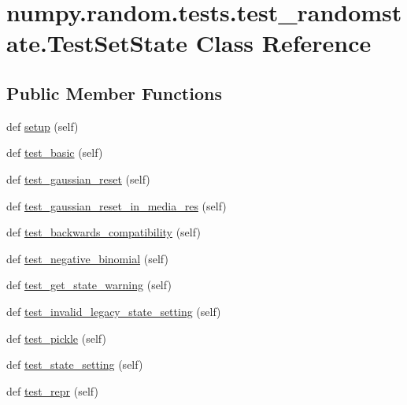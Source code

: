 \hypertarget{classnumpy_1_1random_1_1tests_1_1test__randomstate_1_1TestSetState}{}\section{numpy.\+random.\+tests.\+test\+\_\+randomstate.\+Test\+Set\+State Class Reference}
\label{classnumpy_1_1random_1_1tests_1_1test__randomstate_1_1TestSetState}
\subsection*{Public Member Functions}
\begin{DoxyCompactItemize}
\item 
def \hyperlink{classnumpy_1_1random_1_1tests_1_1test__randomstate_1_1TestSetState_a2c31d9fd7edba6793fc7395040e3c51f}{setup} (self)
\item 
def \hyperlink{classnumpy_1_1random_1_1tests_1_1test__randomstate_1_1TestSetState_a36106b4162b4342aee8ee5138726a541}{test\+\_\+basic} (self)
\item 
def \hyperlink{classnumpy_1_1random_1_1tests_1_1test__randomstate_1_1TestSetState_a1b89c9adb1c556da29f9406598fec15c}{test\+\_\+gaussian\+\_\+reset} (self)
\item 
def \hyperlink{classnumpy_1_1random_1_1tests_1_1test__randomstate_1_1TestSetState_ae439e04bbfbe4f5ea5ffec00da845792}{test\+\_\+gaussian\+\_\+reset\+\_\+in\+\_\+media\+\_\+res} (self)
\item 
def \hyperlink{classnumpy_1_1random_1_1tests_1_1test__randomstate_1_1TestSetState_a49981e7f6607b968e7c7834d71630147}{test\+\_\+backwards\+\_\+compatibility} (self)
\item 
def \hyperlink{classnumpy_1_1random_1_1tests_1_1test__randomstate_1_1TestSetState_aa24c913816a6de0738bd24d2a0d474e6}{test\+\_\+negative\+\_\+binomial} (self)
\item 
def \hyperlink{classnumpy_1_1random_1_1tests_1_1test__randomstate_1_1TestSetState_afb42d565fa3b6967cab5962692e05c9e}{test\+\_\+get\+\_\+state\+\_\+warning} (self)
\item 
def \hyperlink{classnumpy_1_1random_1_1tests_1_1test__randomstate_1_1TestSetState_ade9a60dd5dfaac770add3f0a436a157c}{test\+\_\+invalid\+\_\+legacy\+\_\+state\+\_\+setting} (self)
\item 
def \hyperlink{classnumpy_1_1random_1_1tests_1_1test__randomstate_1_1TestSetState_a563c1afea6febd29aa79c4366f0d87f8}{test\+\_\+pickle} (self)
\item 
def \hyperlink{classnumpy_1_1random_1_1tests_1_1test__randomstate_1_1TestSetState_a058b95871525f47587c2990555b87e0a}{test\+\_\+state\+\_\+setting} (self)
\item 
def \hyperlink{classnumpy_1_1random_1_1tests_1_1test__randomstate_1_1TestSetState_a81d548a55f78e36ed3bfb4dd6ab2f073}{test\+\_\+repr} (self)
\end{DoxyCompactItemize}
